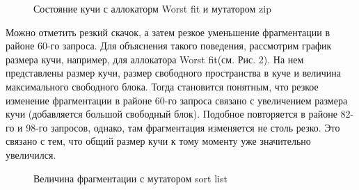 \documentclass[12pt,a4paper]{article}
\begin{document}
   \begin{figure}[p]
   \caption{Состояние кучи с аллокаторм Worst fit и мутатором zip}
   \label{ris:image}
   \end{figure}
   
   Можно отметить резкий скачок, а затем резкое уменьшение фрагментации в районе 60-го запроса. Для объяснения такого поведения, рассмотрим график размера кучи, 
   например, для аллокатора Worst fit(см. Рис. 2). На нем представлены размер кучи, размер свободного пространства в куче и величина максимального свободного
   блока.
   Тогда становится понятным, что резкое изменение фрагментации в районе 60-го запроса связано с увеличением размера кучи (добавляется большой свободный блок). 
   Подобное повторяется в районе 82-го и 98-го запросов, однако, там фрагментация изменяется не столь резко. Это связано с тем, что общий размер кучи к тому моменту
   уже значительно увеличился.
   
   
   \begin{figure}[p]
   \caption{Величина фрагментации с мутатором sort list}
   \label{ris:image}
   \end{figure}
   
\end{document}
